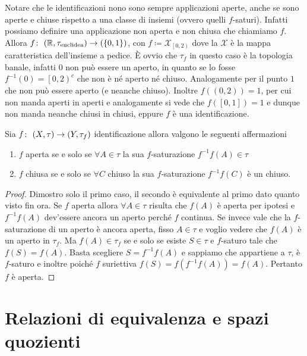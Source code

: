 \begin{remark}
	Notare che le identificazioni nono sono sempre applicazioni aperte, anche se sono aperte e chiuse rispetto a una classe di insiemi (ovvero quelli $f$-saturi). Infatti possiamo definire una applicazione non aperta e non chiusa che chiamiamo $f$. Allora $f \colon\ (\mathbb{R}, \tau_{\text{euclidea}}) \rightarrow (\left\{0,1\right\})$, con $f \coloneqq \mathcal{X}_{\left[0,2\right)}$ dove la $\mathcal{X}$ è la mappa caratteristica dell'insieme a pedice. È ovvio che $\tau_f$ in questo caso è la topologia banale, infatti $0$ non può essere un aperto, in quanto se lo fosse $f^{-1}(0) = \left[0, 2\right)^c$ che non  è né aperto né chiuso. Analogamente per il punto $1$ che non può essere aperto (e neanche chiuso). Inoltre $f((0,2)) = 1$, per cui non manda aperti in aperti e analogamente si vede che $f(\left[0,1\right]) = 1$ e dunque non manda neanche chiusi in chiusi, eppure $f$ è una identificazione.
\end{remark}

\begin{theorem}
	Sia $f \colon\ (X,\tau) \rightarrow (Y, \tau_f)$ identificazione allora valgono le seguenti affermazioni
	\begin{enumerate}
		\item $f$ aperta se e solo se $\forall A \in \tau$ la sua $f$-saturazione $f^{-1}f(A) \in \tau$
		\item $f$ chiusa se e solo se $\forall C$ chiuso la sua $f$-saturazione $f^{-1}f(C)$ è un chiuso.
	\end{enumerate}
\end{theorem}
\begin{proof}
	Dimostro solo il primo caso, il secondo è equivalente al primo dato quanto visto fin ora. Se $f$ aperta allora $\forall A \in \tau$ risulta che $f(A)$ è aperta per ipotesi e $f^{-1}f(A)$ dev'essere ancora un aperto perché $f$ continua. Se invece vale che la $f$-saturazione di un aperto è ancora aperta, fisso $A \in \tau$ e voglio vedere che $f(A)$ è un aperto in $\tau_f$. Ma $f(A) \in \tau_f$ se e solo se esiste $S \in \tau$ e $f$-saturo tale che $f(S) = f(A)$. Basta scegliere $S = f^{-1}f(A)$ e sappiamo che appartiene a $\tau$, è $f$-saturo e inoltre poiché $f$ suriettiva $f(S) = f(f^{-1}f(A)) = f(A)$. Pertanto $f$ è aperta. 
\end{proof}

\section{Relazioni di equivalenza e spazi quozienti}

